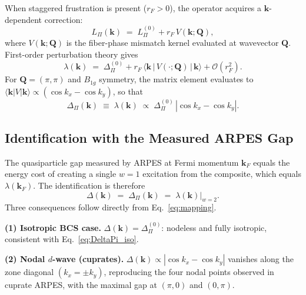     When staggered frustration is present ($r_F > 0$), the operator acquires a
    $\mathbf{k}$-dependent correction:
    \begin{equation}
      L_\Pi(\mathbf{k}) \;=\; L_\Pi^{(0)} + r_F\, V(\mathbf{k};\mathbf{Q}),
      \label{eq:Lpi_k}
    \end{equation}
    where $V(\mathbf{k};\mathbf{Q})$ is the fiber-phase mismatch kernel evaluated at wavevector
    $\mathbf{Q}$.
    First-order perturbation theory gives
    \begin{equation}
      \lambda(\mathbf{k}) \;=\; \Delta_\Pi^{(0)}
      + r_F\,\langle \mathbf{k}\,|\,V(\cdot;\mathbf{Q})\,|\,\mathbf{k}\rangle
      + \mathcal{O}(r_F^2).
      \label{eq:lambda_k}
    \end{equation}
    For $\mathbf{Q} = (\pi,\pi)$ and $B_{1g}$ symmetry, the matrix element evaluates to
    $\langle \mathbf{k}|V|\mathbf{k}\rangle \propto (\cos k_x - \cos k_y)$, so that
    \begin{equation}
      \Delta_\Pi(\mathbf{k}) \;\equiv\; \lambda(\mathbf{k})
      \;\propto\; \Delta_\Pi^{(0)}\,|\cos k_x - \cos k_y|.
      \label{eq:DeltaPi_d}
    \end{equation}

  \subsection{Identification with the Measured ARPES Gap}
    \label{subsec:identification-with-the-measured-arpes-gap}

    The quasiparticle gap measured by ARPES at Fermi momentum $\mathbf{k}_F$ equals the energy
    cost of creating a single $w = 1$ excitation from the composite, which equals
    $\lambda(\mathbf{k}_F)$.
    The identification is therefore
    \begin{equation}
      \Delta(\mathbf{k}) \;=\; \Delta_\Pi(\mathbf{k}) \;=\; \lambda(\mathbf{k})\big|_{w=2}.
      \label{eq:mapping}
    \end{equation}
    Three consequences follow directly from Eq.~\eqref{eq:mapping}.

    \textbf{(1) Isotropic BCS case.}
    $\Delta(\mathbf{k}) = \Delta_\Pi^{(0)}$: nodeless and fully isotropic, consistent with
    Eq.~\eqref{eq:DeltaPi_iso}.

    \textbf{(2) Nodal $d$-wave (cuprates).}
    $\Delta(\mathbf{k}) \propto |\cos k_x - \cos k_y|$ vanishes along the zone diagonal
    $(k_x = \pm k_y)$, reproducing the four nodal points observed in cuprate ARPES, with the
    maximal gap at $(\pi,0)$ and $(0,\pi)$.

